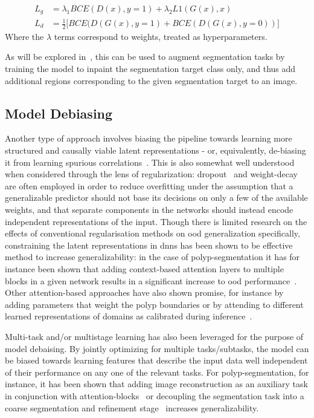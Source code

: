     \begin{align}
    L_g &= \lambda_1 BCE(D(x),y=1) + \lambda_2 L1(G(x), x) \\
    L_d &= \frac{1}{2}\big[ BCE(D(G(x),y=1)+BCE(D(G(x), y=0)) \big]
    \end{align}
    Where the \(\lambda\) terms correspond to weights, treated as hyperparameters. 
     
    As will be explored in~, this can be used to augment segmentation tasks by training the model to inpaint the segmentation target class only, and thus add additional regions corresponding to the given segmentation target to an image.

\subsection{Model Debiasing}
Another type of approach involves biasing the pipeline towards learning more structured and causally viable latent representations - or, equivalently, de-biasing it from learning spurious correlations~\cite{generalization_datamod}. This is also somewhat well understood when considered through the lens of regularization: dropout~\cite{dropout} and weight-decay~\cite{weight_decay} are often employed in order to reduce overfitting under the assumption that a generalizable predictor should not base its decisions on only a few of the available weights, and that separate components in the networks should instead encode independent representations of the input. Though there is limited research on the effects of conventional regularisation methods on \gls{ood} generalization specifically, constraining the latent representations in \glspl{dnn} has been shown to be effective method to increase generalizability: in the case of polyp-segmentation it has for instance been shown that adding context-based attention layers to multiple blocks in a given network results in a significant increase to \gls{ood} performance~\cite{uacanet}. Other attention-based approaches have also shown promise, for instance by adding parameters that weight the polyp boundaries \cite{reverse_attention} or by attending to different learned representations of domains as calibrated during inference~\cite{attention_generalizability}. 

Multi-task and/or multistage learning has also been leveraged for the purpose of model debaising. By jointly optimizing for multiple tasks/subtasks, the model can be biased towards learning features that describe the input data well independent of their performance on any one of the relevant tasks. For polyp-segmentation, for instance, it has been shown that adding image reconstruction as an auxiliary task in conjunction with attention-blocks~\cite{ddanet} or decoupling the segmentation task into a coarse segmentation and refinement stage~\cite{doubleencdec} increases generalizability. 

